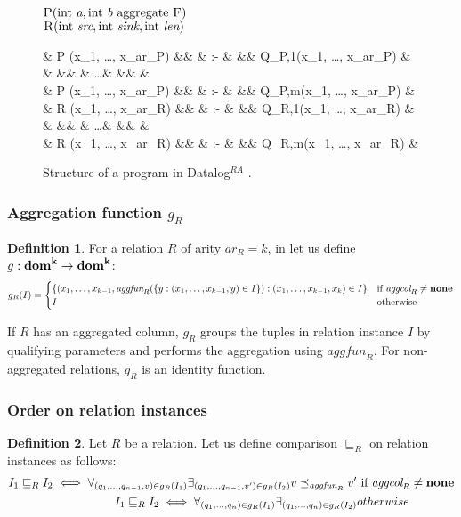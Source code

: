 \documentclass{pracamgr}
\theoremstyle{plain}
\theoremstyle{definition}
\newtheorem{defn}{Definition}[section]
\theoremstyle{remark}
\newcommand{\datalogra}{Datalog$^{RA}$ }
\newcommand{\aggfun}{\textit{aggfun} }
\newcommand{\aggcol}{\textit{aggcol} }
\newcommand{\narrow}[1]{\begin{changemargin}{2cm}{2cm} #1 \end{changemargin}}
\begin{document}
\begin{figure}[h!]
\narrow{
  $\textsc{P}(\text{int } \textit{a}, \text{int } \textit{b} \text{ aggregate } \textsc{F}) $\\
  $\textsc{R}(\text{int } \textit{src}, \text{int } \textit{sink}, \text{int } \textit{len}) $ 
  \begin{flalign*}
  & \textsc{P} (x_1, \dots, x_{ar_P}) &&  & :- & && Q_{P,1}(x_1, \dots, x_{ar_P}) & \\
  &  &&  & \dots & && & \\
  & \textsc{P} (x_1, \dots, x_{ar_P}) &&  & :- & && Q_{P,m}(x_1, \dots, x_{ar_P}) & \\
  & \textsc{R} (x_1, \dots, x_{ar_R}) &&  & :- & && Q_{R,1}(x_1, \dots, x_{ar_R}) & \\
  &  &&  & \dots & && & \\
  & \textsc{R} (x_1, \dots, x_{ar_R}) &&  & :- & && Q_{R,m}(x_1, \dots, x_{ar_R}) & \\
  \end{flalign*}
  \caption{Structure of a program in \datalogra.}
}
\end{figure}

\subsubsection{Aggregation function $g_R$}
\begin{defn}
For a relation $R$ of arity $ar_R = k$, in let us define $g: \bf{dom}^k \to \bf{dom}^k$:
$$
g_R(I) = \begin{cases}
\{(x_1, \dots, x_{k-1}, \aggfun_R(\{y: (x_1, \dots, x_{k-1}, y) \in I\}): (x_1, \dots, x_{k-1}, x_k) \in I\} & \text{if } \aggcol_R \ne \bf{none} \\
I & \text{otherwise}
\end{cases}
$$
\end{defn}

If $R$ has an aggregated column, $g_R$ groups the tuples in relation instance $I$ by qualifying parameters and performs the aggregation using $\aggfun_R$. For non-aggregated relations, $g_R$ is an identity function.

\subsubsection{Order on relation instances}
\begin{defn}
Let $R$ be a relation. Let us define comparison $\sqsubseteq_R$ on relation instances as follows:
\begin{align}
I_1 \sqsubseteq_R I_2 \iff \forall_{(q_1, ..., q_{n-1}, v) \in g_R(I_1)} \exists_{(q_1, ..., q_{n-1}, v') \in g_R(I_2)} v \preceq_{\aggfun_R} v' & \text{ if } \aggcol_R \ne \bf{none} \\
I_1 \sqsubseteq_R I_2 \iff \forall_{(q_1, ..., q_n) \in g_R(I_1)} \exists_{(q_1, ..., q_n) \in g_R(I_2)} & otherwise
\end{align}
\end{defn}
\end{document}
